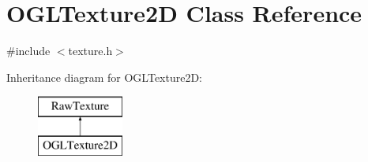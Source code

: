 \hypertarget{class_o_g_l_texture2_d}{}\section{O\+G\+L\+Texture2\+D Class Reference}
\label{class_o_g_l_texture2_d}


{\ttfamily \#include $<$texture.\+h$>$}

Inheritance diagram for O\+G\+L\+Texture2\+D\+:\begin{figure}[H]
\begin{center}
\leavevmode
\includegraphics[height=2.000000cm]{class_o_g_l_texture2_d}
\end{center}
\end{figure}
